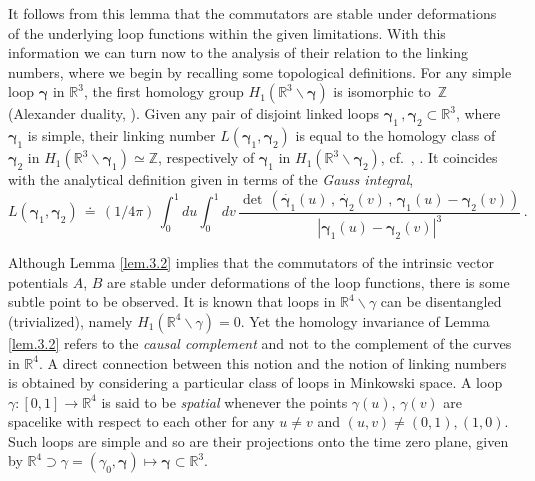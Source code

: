 \documentclass[11pt]{article}
\numberwithin{equation}{section}
\newcommand{\RR}{{\mathbb R}}
\newcommand{\ZZ}{{\mathbb Z}}
\newcommand{\bgamma}{{\bm \gamma}}
\begin{document}
\medskip
It follows from this lemma that the commutators are stable under
deformations of the underlying loop functions within the given 
limitations. With this information we can turn now to the 
analysis of their relation to the linking numbers, 
where we begin by recalling some topological definitions.
For any simple loop $\bgamma$ in $\RR^3$, the first homology group  
$H_1(\RR^3 \backslash \bgamma)$ is isomorphic to~$\ZZ$ 
(Alexander duality, \cite[Chpt.~3]{Hatcher}).
Given any pair of disjoint linked loops 
$\bgamma_1 \, , \bgamma_2 \subset \RR^3$, where $\bgamma_1$ is simple, 
their linking 
number  $L(\bgamma_1, \bgamma_2)$ is equal to  the homology 
class of $\bgamma_2$ in  $H_1(\RR^3 \backslash \bgamma_1) \simeq \ZZ$,
respectively of $\bgamma_1$ in  $H_1(\RR^3 \backslash \bgamma_2)$, 
cf.~\cite[Chpt.~1]{Hatcher}, \cite[Chpt.~5]{Rolfsen}. 
It coincides with the 
analytical definition given in terms of the \emph{Gauss integral},  
%
\begin{equation}
\label{eq.gauss}
L(\bgamma_1, \bgamma_2) \, \doteq \,
(1/4 \pi) \, 
\int_0^1 \! du \! \int_0^1 \! dv \, 
\frac
{ \det \, ( \dot{\bgamma_1}(u) \, , \, \dot{\bgamma_2}(v) 
\, , \, \bgamma_1(u) - \bgamma_2(v) ) }
{ | \bgamma_1(u) - \bgamma_2(v) |^3 } \, .
\end{equation}
%   

\medskip
Although Lemma \ref{lem.3.2} implies that the commutators of the 
intrinsic vector potentials $A$, $B$ are stable under
deformations of the loop functions, there is some 
subtle point to be observed. It is known that
loops in  $\RR^4 \backslash \gamma$ can be disentangled 
(trivialized), namely $H_1(\RR^4 \backslash \gamma) = 0$. 
Yet the homology invariance of 
Lemma \ref{lem.3.2} refers to the \emph{causal
complement} and not to the complement of the curves in $\RR^4$. 
A direct connection between this notion and the 
notion of linking numbers is obtained 
by considering a particular class of loops in Minkowski space.
A loop $\gamma:[0,1]\to\RR^4$ is said to be \emph{spatial} whenever 
the points $\gamma(u)$, $\gamma(v)$ are spacelike with respect
to each other for any $u \ne v$ 
and $(u,v) \ne (0,1),(1,0)$. Such loops are simple and so are 
their projections onto the time zero plane, given by  
$\RR^4 \supset \gamma = (\gamma_0, \bgamma) \mapsto \bgamma \subset \RR^3$. 
\end{document}
